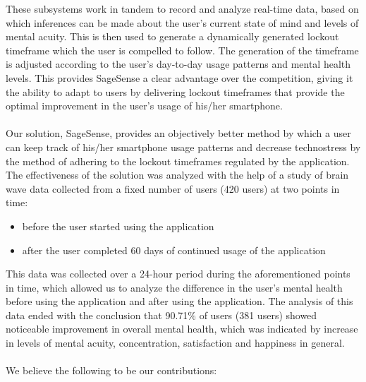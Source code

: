 \documentclass{article}
\begin{document}
These subsystems work in tandem to record and analyze real-time data, based on which inferences can be made about the user's current state of mind and levels of mental acuity. This is then used to generate a dynamically generated lockout timeframe which the user is compelled to follow. The generation of the timeframe is adjusted according to the user's day-to-day usage patterns and mental health levels. This provides SageSense a clear advantage over the competition, giving it the ability to adapt to users by delivering lockout timeframes that provide the optimal improvement in the user's usage of his/her smartphone.

\paragraph{} Our solution, SageSense, provides an objectively better method by which a user can keep track of his/her smartphone usage patterns and decrease technostress by the method of adhering to the lockout timeframes regulated by the application. The effectiveness of the solution was analyzed with the help of a study of brain wave data collected from a fixed number of users (420 users) at two points in time:

\begin{itemize}
    \item before the user started using the application
    \item after the user completed 60 days of continued usage of the application
\end{itemize}

This data was collected over a 24-hour period during the aforementioned points in time, which allowed us to analyze the difference in the user's mental health before using the application and after using the application. The analysis of this data ended with the conclusion that 90.71\% of users (381 users) showed noticeable improvement in overall mental health, which was indicated by increase in levels of mental acuity, concentration, satisfaction and happiness in general.

\paragraph{} We believe the following to be our contributions:
\end{document}
